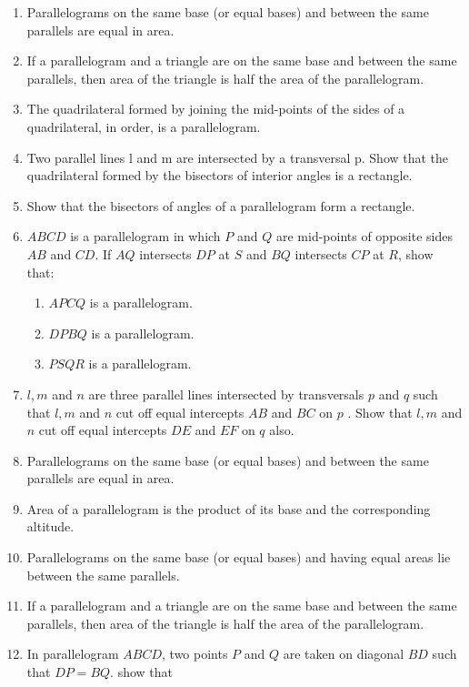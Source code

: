 \renewcommand{\theequation}{\theenumi}
\begin{enumerate}[label=\arabic*.,ref=\thesubsection.\theenumi]
%
%
%
%
\item Parallelograms on the same base (or equal bases) and between the same parallels are equal in area.
\item If a parallelogram and a triangle are on the same base and between the same parallels, then area of the triangle is half the area of the parallelogram.
%
\item  The quadrilateral formed by joining the mid-points of the sides of a quadrilateral, in order, is a parallelogram.
%
%
\item Two parallel lines l and m are intersected by a transversal p. Show that the quadrilateral formed by the bisectors of interior angles is a rectangle.
%
\item Show that the bisectors of angles of a parallelogram form a rectangle.
%
%
\item $ABCD$ is a parallelogram in which $P$ and $Q$ are mid-points of opposite sides $AB$ and $CD$. If $AQ$ intersects $DP$ at $S$ and $BQ$ intersects $CP$ at $R$, show that: 
%
\begin{enumerate}
\item  $APCQ$ is a parallelogram. 
\item $DPBQ$ is a parallelogram. 
\item $PSQR$ is a parallelogram.
\end{enumerate}
%
\item $l, m$ and $n$ are three parallel lines intersected by transversals $p$ and $q$ such that $l, m$ and $n$ cut off equal intercepts $AB$ and $BC$ on $p$ . Show that $l, m$ and $n$ cut off equal intercepts $DE$ and $EF$ on $q$ also.
%
\item Parallelograms on the same base (or equal bases) and between the same parallels are equal in area.
\item Area of a parallelogram is the product of its base and the corresponding altitude. 
\item Parallelograms on the same base (or equal bases) and having equal areas lie between the same parallels.
\item If a parallelogram and a triangle are on the same base and between the same parallels, then area of the triangle is half the area of the parallelogram.
\item In parallelogram $ABCD$, two points $P$ and $Q$ are taken on diagonal $BD$ such that $DP = BQ$. show that \begin{enumerate}

\end{enumerate}
\end{enumerate}
